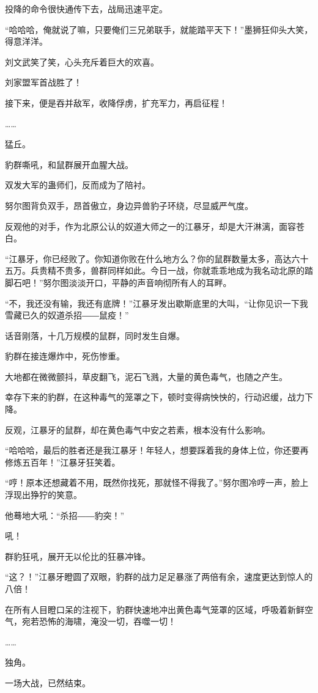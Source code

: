 \begin{this_body}
投降的命令很快通传下去，战局迅速平定。

“哈哈哈，俺就说了嘛，只要俺们三兄弟联手，就能踏平天下！”墨狮狂仰头大笑，得意洋洋。

刘文武笑了笑，心头充斥着巨大的欢喜。

刘家盟军首战胜了！

接下来，便是吞并敌军，收降俘虏，扩充军力，再启征程！

……

猛丘。

豹群嘶吼，和鼠群展开血腥大战。

双发大军的蛊师们，反而成为了陪衬。

努尔图背负双手，昂首傲立，身边异兽豹子环绕，尽显威严气度。

反观他的对手，作为北原公认的奴道大师之一的江暴牙，却是大汗淋漓，面容苍白。

“江暴牙，你已经败了。你知道你败在什么地方么？你的鼠群数量太多，高达六十五万。兵贵精不贵多，兽群同样如此。今日一战，你就乖乖地成为我名动北原的踏脚石吧！”努尔图淡淡开口，平静的声音响彻所有人的耳畔。

“不，我还没有输，我还有底牌！”江暴牙发出歇斯底里的大叫，“让你见识一下我雪藏已久的奴道杀招――鼠疫！”

话音刚落，十几万规模的鼠群，同时发生自爆。

豹群在接连爆炸中，死伤惨重。

大地都在微微颤抖，草皮翻飞，泥石飞溅，大量的黄色毒气，也随之产生。

幸存下来的豹群，在这种毒气的笼罩之下，顿时变得病怏怏的，行动迟缓，战力下降。

反观，江暴牙的鼠群，却在黄色毒气中安之若素，根本没有什么影响。

“哈哈哈，最后的胜者还是我江暴牙！年轻人，想要踩着我的身体上位，你还要再修炼五百年！”江暴牙狂笑着。

“哼！原本还想藏着不用，既然你找死，那就怪不得我了。”努尔图冷哼一声，脸上浮现出狰狞的笑意。

他蓦地大吼：“杀招――豹突！”

吼！

群豹狂吼，展开无以伦比的狂暴冲锋。

“这？！”江暴牙瞪圆了双眼，豹群的战力足足暴涨了两倍有余，速度更达到惊人的八倍！

在所有人目瞪口呆的注视下，豹群快速地冲出黄色毒气笼罩的区域，呼吸着新鲜空气，宛若恐怖的海啸，淹没一切，吞噬一切！

……

独角。

一场大战，已然结束。


\end{this_body}
